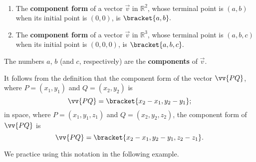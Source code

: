 {\mbox{}\\[-2\baselineskip]\begin{enumerate}
	\item The \textbf{component form} of a vector $\vec{v}$ in $\mathbb{R}^2$, whose terminal point is $(a,b)$ when its initial point is $(0,0)$, is $\bracket{a,b}.$ 
	
	\item The \textbf{component form} of a vector $\vec{v}$ in $\mathbb{R}^3$, whose terminal point is $(a,b,c)$ when its initial point is $(0,0,0)$, is $\bracket{a,b,c}.$ 
	
\end{enumerate}
The numbers $a$, $b$ (and $c$, respectively) are the \textbf{components} of $\vec v$.
}


It follows from the definition that the component form of the vector $\vv{PQ}$, where $P=(x_1,y_1)$ and $Q=(x_2,y_2)$ is
\[\vv{PQ} =\bracket{x_2-x_1, y_2-y_1};\]
in space, where $P=(x_1,y_1,z_1)$ and $Q=(x_2,y_2,z_2)$, the component form of $\vv{PQ}$ is	\[\vv{PQ} =\bracket{x_2-x_1, y_2-y_1,z_2-z_1}.\]


We practice using this notation in the following example.

